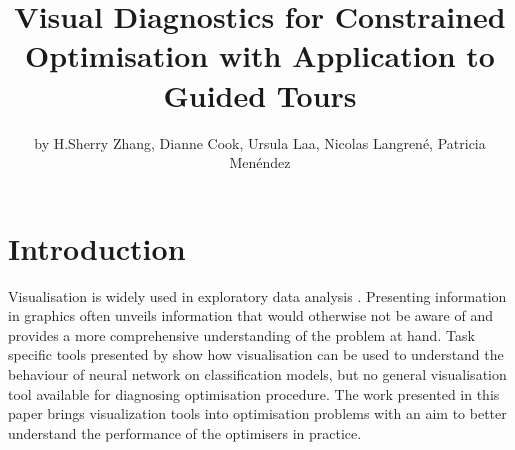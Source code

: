 \title{Visual Diagnostics for Constrained Optimisation with Application to
Guided Tours}
\author{by H.Sherry Zhang, Dianne Cook, Ursula Laa, Nicolas Langrené, Patricia Menéndez}

\maketitle


\hypertarget{introduction}{%
\section{Introduction}\label{introduction}}

Visualisation is widely used in exploratory data analysis
\citep{tukey1977exploratory, unwin2015graphical, healy2018data, wilke2019fundamentals}.
Presenting information in graphics often unveils information that would
otherwise not be aware of and provides a more comprehensive
understanding of the problem at hand. Task specific tools presented by
\citet{li2020visualizing} show how visualisation can be used to
understand the behaviour of neural network on classification models, but
no general visualisation tool available for diagnosing optimisation
procedure. The work presented in this paper brings visualization tools
into optimisation problems with an aim to better understand the
performance of the optimisers in practice.

